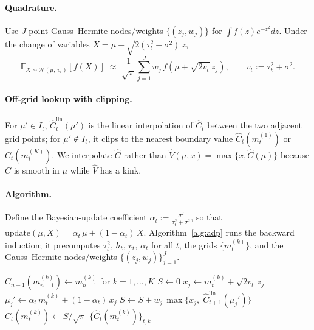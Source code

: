 \documentclass[11pt]{article}
\begin{document}
\paragraph{Quadrature.} Use $J$-point Gauss--Hermite nodes/weights $\{(z_j, w_j)\}$ for $\int f(z)e^{-z^2}dz$. Under the change of variables $X = \mu + \sqrt{2(\tau_t^2+\sigma^2)}\,z$,
\[
\mathbb{E}_{X\sim\mathcal{N}(\mu,\,v_t)}[f(X)] \;\approx\; \frac{1}{\sqrt\pi}\sum_{j=1}^J w_j\, f\!\left(\mu + \sqrt{2 v_t}\,z_j\right),
\qquad v_t := \tau_t^2 + \sigma^2.
\]

\paragraph{Off-grid lookup with clipping.} For $\mu' \in I_t$, $\widehat{C}_t^{\mathrm{lin}}(\mu')$ is the linear interpolation of $\widehat{C}_t$ between the two adjacent grid points; for $\mu' \notin I_t$, it clips to the nearest boundary value $\widehat{C}_t(m_t^{(1)})$ or $\widehat{C}_t(m_t^{(K)})$. We interpolate $\widehat{C}$ rather than $\widehat{V}(\mu, x) = \max\{x,\widehat{C}(\mu)\}$ because $\widehat{C}$ is smooth in $\mu$ while $\widehat{V}$ has a kink.

\paragraph{Algorithm.} Define the Bayesian-update coefficient $\alpha_t := \frac{\sigma^2}{\tau_t^2 + \sigma^2}$, so that $\mathrm{update}(\mu, X) = \alpha_t\,\mu + (1-\alpha_t)\,X$. Algorithm~\ref{alg:adp} runs the backward induction; it precomputes $\tau_t^2$, $h_t$, $v_t$, $\alpha_t$ for all $t$, the grids $\{m_t^{(k)}\}$, and the Gauss--Hermite nodes/weights $\{(z_j, w_j)\}_{j=1}^J$.

\begin{algorithm}[H]
\caption{Approximate DP for the Bayes-optimal reservation price.}
\label{alg:adp}
\begin{algorithmic}[1]
\State $\widehat{C}_{n-1}(m_{n-1}^{(k)}) \gets m_{n-1}^{(k)}$ \quad for $k = 1,\ldots,K$
    \State $S \gets 0$
      \State $x_j \gets m_t^{(k)} + \sqrt{2 v_t}\,z_j$
      \State $\mu_j' \gets \alpha_t\, m_t^{(k)} + (1-\alpha_t)\, x_j$
      \State $S \gets S + w_j\,\max\!\big\{x_j,\; \widehat{C}_{t+1}^{\mathrm{lin}}(\mu_j')\big\}$
    \EndFor
    \State $\widehat{C}_t(m_t^{(k)}) \gets S / \sqrt{\pi}$
  \EndFor
\EndFor
\State \Return $\{\widehat{C}_t(m_t^{(k)})\}_{t,k}$
\end{algorithmic}
\end{algorithm}
\end{document}
